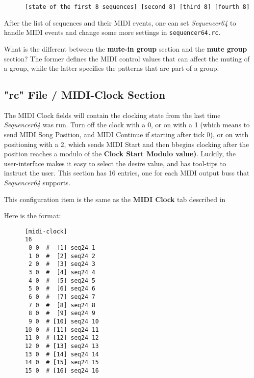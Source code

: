    \begin{verbatim}
      [state of the first 8 sequences] [second 8] [third 8] [fourth 8]
   \end{verbatim}

   After the list of sequences and their MIDI events, one can 
   set \textsl{Sequencer64} to handle MIDI events and change some more settings
   in \texttt{sequencer64.rc}.

   What is the different between the \textbf{mute-in group}
   section and the \textbf{mute group} section?  The former defines the MIDI
   control values that can affect the muting of a group, while the latter
   specifies the patterns that are part of a group.

\subsection{"rc" File / MIDI-Clock Section}
\label{subsec:seq64_rc_file_midi_clock}

   The MIDI Clock fields will contain the clocking state from the last 
   time \textsl{Sequencer64} was run.  Turn off the clock with a 0, or on
   with a 1 (which means to send MIDI Song Position, and MIDI Continue if
   starting after tick 0), or on with positioning with a 2, which sends MIDI
   Start and then bbegins clocking after the position reaches a modulo of the
   \textbf{Clock Start Modulo value)}.  Luckily, the user-interface makes it
   easy to select the desire value, and has tool-tips to instruct the user.
   This section has 16 entries, one for each MIDI output buss that
   \textsl{Sequencer64} supports.

   This configuration item is the same as the 
   \textbf{MIDI Clock} tab described in
   
   Here is the format:

   \begin{verbatim}
      [midi-clock]
      16
       0 0  #  [1] seq24 1
       1 0  #  [2] seq24 2
       2 0  #  [3] seq24 3
       3 0  #  [4] seq24 4
       4 0  #  [5] seq24 5
       5 0  #  [6] seq24 6
       6 0  #  [7] seq24 7
       7 0  #  [8] seq24 8
       8 0  #  [9] seq24 9
       9 0  # [10] seq24 10
      10 0  # [11] seq24 11
      11 0  # [12] seq24 12
      12 0  # [13] seq24 13
      13 0  # [14] seq24 14
      14 0  # [15] seq24 15
      15 0  # [16] seq24 16
   \end{verbatim}

